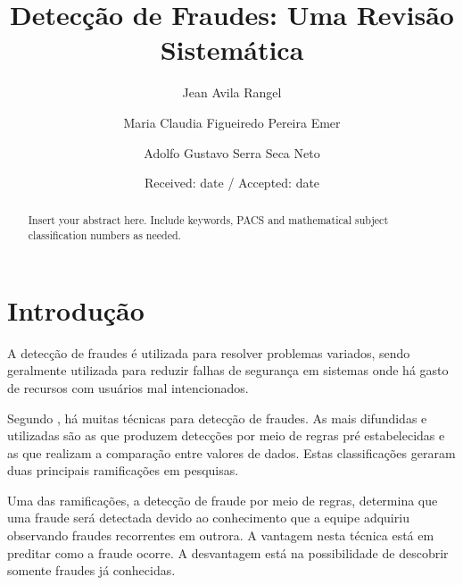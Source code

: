 \documentclass[smallextended]{svjour3}       %
\begin{document}
	
\title{Detecção de Fraudes: Uma Revisão Sistemática
}
\subtitle{}


\author{Jean Avila Rangel         \and
	Maria Claudia Figueiredo Pereira Emer \and
	Adolfo Gustavo Serra Seca Neto
}

	\date{Received: date / Accepted: date}
	\maketitle
	
	\begin{abstract}
		Insert your abstract here. Include keywords, PACS and mathematical
		subject classification numbers as needed.
	\end{abstract}
	
\section{Introdução}
\label{sec:1}

A detecção de fraudes é utilizada para resolver problemas variados, sendo geralmente utilizada para reduzir falhas de segurança em sistemas onde há gasto de recursos com usuários mal intencionados.

Segundo \cite{Fawcett1997}, há muitas técnicas para detecção de fraudes. As mais difundidas e utilizadas são as que produzem detecções por meio de regras pré estabelecidas e as que realizam a comparação entre valores de dados. Estas classificações geraram duas principais ramificações em pesquisas.

Uma das ramificações, a detecção de fraude por meio de regras, determina que uma fraude será detectada devido ao conhecimento que a equipe adquiriu observando fraudes recorrentes em outrora. A vantagem nesta técnica está em preditar como a fraude ocorre. A desvantagem está na possibilidade de descobrir somente fraudes já conhecidas.
\end{document}
